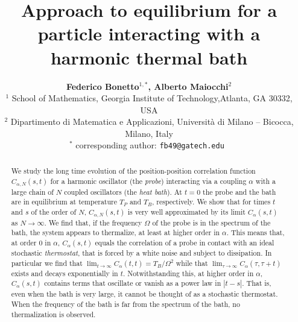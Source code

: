\documentclass[11pt]{article}
\numberwithin{equation}{section}
\numberwithin{theorem}{section}
\begin{document}
 
\title{\bf Approach to equilibrium for a particle interacting with
  a harmonic thermal bath}
 

\author{{\bf Federico Bonetto$^{1,*}$, Alberto Maiocchi$^2$}\\
	\small $^1$ School of Mathematics, Georgia Institute of Technology,Atlanta, GA 30332, USA\\
	\small $^2$ Dipartimento di Matematica e Applicazioni, Universit\`a di Milano -- Bicocca, Milano, Italy\\
	\small $^*$ corresponding author: \tt fb49@gatech.edu
}
\date{} 
 
\maketitle 
 
\begin{abstract} 
  We study the long time evolution of the position-position correlation function $C_{\alpha,N}(s,t)$ for a harmonic
oscillator (the {\it probe}) interacting via a coupling $\alpha$ with a large chain of $N$ coupled oscillators (the
{\it heat bath}). At $t=0$ the probe and the bath are in equilibrium at temperature $T_P$ and $T_B$, respectively. We
show that for times $t$ and $s$ of the order of $N$, $C_{\alpha,N}(s,t)$ is very well approximated by its limit
$C_{\alpha}(s,t)$ as $N\to\infty$. We find that, if the frequency $\Omega$ of the probe is in the spectrum of the
bath, the system appears to thermalize, at least at higher order in $\alpha$. This means that, at order 0 in $\alpha$,
$C_\alpha(s,t)$ equals the correlation of a probe in contact with an ideal stochastic {\it thermostat}, that is forced
by a white noise and subject to dissipation. In particular we find that $\lim_{t\to\infty}
C_\alpha(t,t)=T_B/\Omega^2$ while that $\lim_{\tau\to\infty} C_\alpha(\tau,\tau+t)$ exists and decays exponentially in
$t$. Notwithstanding this, at higher order in $\alpha$, $C_{\alpha}(s,t)$ contains terms that oscillate or vanish as a
power law in $|t-s|$. That is, even when the bath is very large, it cannot be thought of as a stochastic thermostat. 
When the frequency of the bath is far from the spectrum of the bath, no thermalization is observed.
\end{abstract} 
  
 \tableofcontents
 
\end{document}
